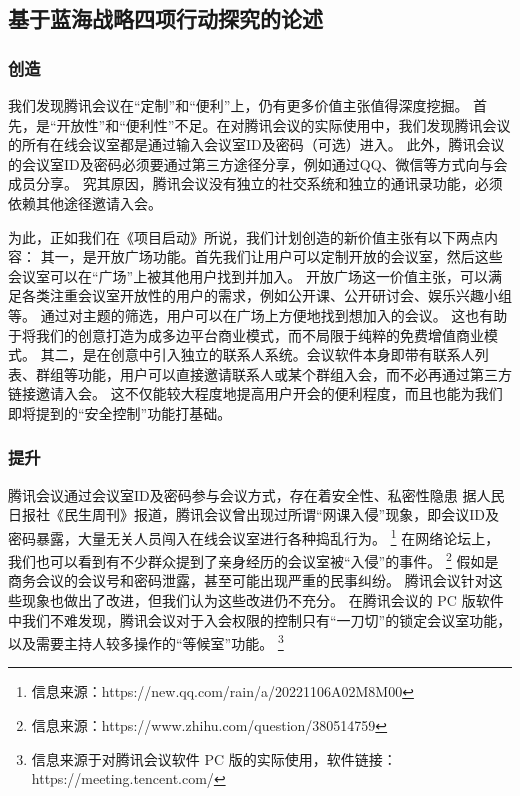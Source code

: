 \documentclass[a4paper,12pt]{article}
\begin{document}
    \subsection{基于蓝海战略四项行动探究的论述}
    \subsubsection{创造}
    我们发现腾讯会议在“定制”和“便利”上，仍有更多价值主张值得深度挖掘。
    首先，是“开放性”和“便利性”不足。在对腾讯会议的实际使用中，我们发现腾讯会议的所有在线会议室都是通过输入会议室ID及密码（可选）进入。
    此外，腾讯会议的会议室ID及密码必须要通过第三方途径分享，例如通过QQ、微信等方式向与会成员分享。
    究其原因，腾讯会议没有独立的社交系统和独立的通讯录功能，必须依赖其他途径邀请入会。


    为此，正如我们在《项目启动》所说，我们计划创造的新价值主张有以下两点内容：
    其一，是开放广场功能。首先我们让用户可以定制开放的会议室，然后这些会议室可以在“广场”上被其他用户找到并加入。
    开放广场这一价值主张，可以满足各类注重会议室开放性的用户的需求，例如公开课、公开研讨会、娱乐兴趣小组等。
    通过对主题的筛选，用户可以在广场上方便地找到想加入的会议。
    这也有助于将我们的创意打造为成多边平台商业模式，而不局限于纯粹的免费增值商业模式。
    其二，是在创意中引入独立的联系人系统。会议软件本身即带有联系人列表、群组等功能，用户可以直接邀请联系人或某个群组入会，而不必再通过第三方链接邀请入会。
    这不仅能较大程度地提高用户开会的便利程度，而且也能为我们即将提到的“安全控制”功能打基础。

    \subsubsection{提升}

    腾讯会议通过会议室ID及密码参与会议方式，存在着安全性、私密性隐患
    据人民日报社《民生周刊》报道，腾讯会议曾出现过所谓“网课入侵”现象，即会议ID及密码暴露，大量无关人员闯入在线会议室进行各种捣乱行为。
    \footnote{信息来源：https://new.qq.com/rain/a/20221106A02M8M00}
    在网络论坛上，我们也可以看到有不少群众提到了亲身经历的会议室被“入侵”的事件。
    \footnote{信息来源：https://www.zhihu.com/question/380514759}
    假如是商务会议的会议号和密码泄露，甚至可能出现严重的民事纠纷。
    腾讯会议针对这些现象也做出了改进，但我们认为这些改进仍不充分。
    在腾讯会议的 PC 版软件中我们不难发现，腾讯会议对于入会权限的控制只有“一刀切”的锁定会议室功能，以及需要主持人较多操作的“等候室”功能。
    \footnote{信息来源于对腾讯会议软件 PC 版的实际使用，软件链接：https://meeting.tencent.com/}
\end{document}
